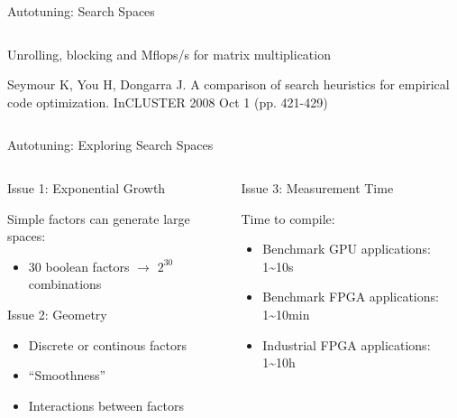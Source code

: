 \documentclass[10pt, compress, aspectratio=169, xcolor={table,usenames,dvipsnames}]{beamer}
\begin{document}
\begin{frame}[label={sec:org023056f}]{Autotuning: Search Spaces}
\begin{columns}
\begin{column}{0.6\columnwidth}
\begin{center}
\alert{Unrolling}, \alert{blocking} and \alert{Mflops/s} for \alert{matrix multiplication}

\vspace{.1cm}

\scriptsize{Seymour K, You H, Dongarra J. A comparison of search heuristics for empirical code optimization. InCLUSTER 2008 Oct 1 (pp. 421-429)}
\end{center}
\end{column}
\end{columns}
\end{frame}

\begin{frame}[label={sec:org0d04510}]{Autotuning: Exploring Search Spaces}
\begin{columns}
\begin{column}{0.5\columnwidth}
\begin{block}{Issue 1: \alert{Exponential Growth}}
\vspace{.2cm}

\alert{Simple factors} can generate \alert{large spaces}:

\begin{itemize}
\item 30 \alert{boolean} factors \(\rightarrow\) \(2^{30}\) combinations
\end{itemize}

\begin{block}{Issue 2: \alert{Geometry}}
\begin{itemize}
\item \alert{Discrete} or \alert{continous} factors
\item \alert{``Smoothness''}
\item \alert{Interactions} between factors
\end{itemize}
\end{block}
\end{block}
\end{column}

\begin{column}{0.5\columnwidth}
\begin{block}{Issue 3: \alert{Measurement Time}}
\vspace{.2cm}

Time to \alert{compile}:

\begin{itemize}
\item \alert{Benchmark} GPU applications: \alert{1\textasciitilde{}10s}
\item \alert{Benchmark} FPGA applications: \alert{1\textasciitilde{}10min}
\item \alert{Industrial} FPGA applications: \alert{1\textasciitilde{}10h}
\end{itemize}
\end{block}
\end{column}
\end{columns}
\end{frame}
\end{document}
